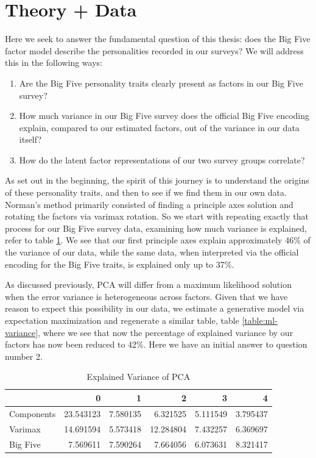 \documentclass[a4paper,12pt]{article}
\begin{document}
\section{Theory + Data}

Here we seek to answer the fundamental question of this thesis: does the Big Five factor model describe the personalities recorded in our surveys? We will address this in the following ways:

\begin{enumerate}

\item Are the Big Five personality traits clearly present as factors in our Big Five survey?

\item How much variance in our Big Five survey does the official Big Five encoding explain, compared to our estimated factors, out of the variance in our data itself?

\item How do the latent factor representations of our two survey groups correlate?
\end{enumerate}

As set out in the beginning, the spirit of this journey is to understand the origins of these personality traits, and then to see if we find them in our own data. Norman's method primarily consisted of finding a principle axes solution and rotating the factors via varimax rotation. So we start with repeating exactly that process for our Big Five survey data, examining how much variance is explained, refer to table \ref{table:pca-variance}. We see that our first principle axes explain approximately 46\% of the variance of our data, while the same data, when interpreted via the official encoding for the Big Five traits, is explained only up to 37\%.

As discussed previously, PCA will differ from a maximum likelihood solution when the error variance is heterogeneous across factors. Given that we have reason to expect this possibility in our data, we estimate a generative model via expectation maximization and regenerate a similar table, table \ref{table:ml-variance}, where we see that now the percentage of explained variance by our factors has now been reduced to 42\%. Here we have an initial answer to question number 2.



\begin{table}
\begin{tabular}{lrrrrr}
\toprule
{} &          0 &         1 &          2 &         3 &         4 \\
\midrule
Components &  23.543123 &  7.580135 &   6.321525 &  5.111549 &  3.795437 \\
Varimax    &  14.691594 &  5.573418 &  12.284804 &  7.432257 &  6.369697 \\
Big Five   &   7.569611 &  7.590264 &   7.664056 &  6.073631 &  8.321417 \\
\bottomrule
\end{tabular}
\caption{Explained Variance of PCA}\label{table:pca-variance}
\end{table}
\end{document}
